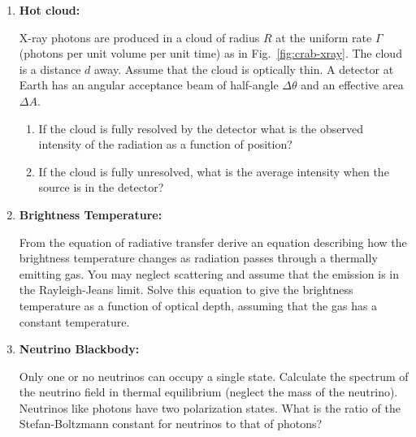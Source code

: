 \begin{enumerate}
\item {\bf Hot cloud:} 

  X-ray photons are produced in a cloud of radius $R$ at the uniform
  rate $\Gamma$ (photons per unit volume per unit time) as in
  Fig.~\ref{fig:crab-xray}.  The cloud is a distance $d$ away.
  Assume that the cloud is optically thin.  A detector at Earth has an
  angular acceptance beam of half-angle $\Delta \theta$ and an
  effective area $\Delta A$.
\begin{enumerate}
\item If the cloud is fully resolved by the detector what is the
  observed intensity of the radiation as a function of position?
\item If the cloud is fully unresolved, what is the average intensity
  when the source is in the detector?
\end{enumerate}
\item {\bf Brightness Temperature:}

From the equation of radiative transfer derive an equation describing
how the brightness temperature changes as radiation passes through a
thermally emitting gas.  You may neglect scattering and assume that
the emission is in the Rayleigh-Jeans limit.  Solve this equation to
give the brightness temperature as a function of optical depth,
assuming that the gas has a constant temperature. 

\item {\bf Neutrino Blackbody:} 

Only one or no neutrinos can occupy a single state.  Calculate the
spectrum of the neutrino field in thermal equilibrium (neglect the
mass of the neutrino).  Neutrinos like photons have two polarization
states.  What is the ratio of the Stefan-Boltzmann constant for
neutrinos to that of photons?


\end{enumerate}
